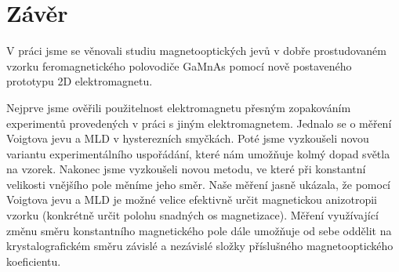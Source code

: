 \chapter*{Závěr}

V práci jsme se věnovali studiu magnetooptických jevů v dobře prostudovaném vzorku feromagnetického polovodiče GaMnAs pomocí nově postaveného prototypu 2D elektromagnetu.

Nejprve jsme ověřili použitelnost elektromagnetu přesným zopakováním experimentů provedených v práci \cite{Reichlova} s jiným elektromagnetem. Jednalo se o měření Voigtova jevu a MLD v hysterezních smyčkách. Poté jsme vyzkoušeli novou variantu experimentálního uspořádání, které nám umožňuje kolmý dopad světla na vzorek. Nakonec jsme vyzkoušeli novou metodu, ve které při konstantní velikosti vnějšího pole měníme jeho směr.
Naše měření jasně ukázala, že pomocí Voigtova jevu a MLD je možné velice efektivně určit magnetickou anizotropii vzorku (konkrétně určit polohu snadných os magnetizace). Měření využívající změnu směru konstantního magnetického pole dále umožňuje od sebe oddělit na krystalografickém směru závislé a nezávislé složky příslušného magnetooptického koeficientu.
